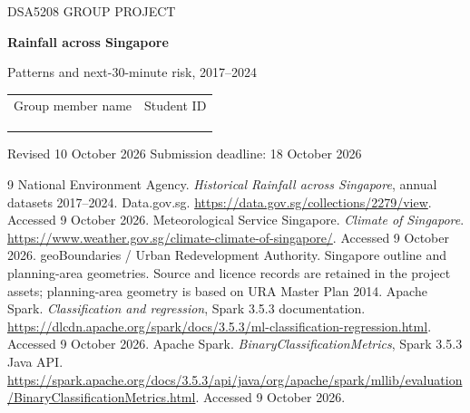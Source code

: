 \documentclass[11pt,a4paper]{article}
\begin{document}
\thispagestyle{empty}
{\small\sffamily\color{teal}DSA5208 GROUP PROJECT}\par
\vspace{3mm}
{\LARGE\sffamily\bfseries\color{ink}Rainfall across Singapore}\par
\vspace{1mm}
{\large\sffamily Patterns and next-30-minute risk, 2017--2024}\par
\vspace{4mm}
\begin{tabularx}{\linewidth}{@{}>{\raggedright\arraybackslash}X>{\raggedright\arraybackslash}X@{}}
\small Group member name & \small Student ID\\[5pt]
\hrulefill & \hrulefill\\[5pt]
\hrulefill & \hrulefill\\[5pt]
\hrulefill & \hrulefill\\
\end{tabularx}
\vspace{2mm}
{\small Revised 10 October 2026 \hfill Submission deadline: 18 October 2026}\par


\FloatBarrier

\FloatBarrier

\FloatBarrier

\begingroup\small\raggedright
\begin{thebibliography}{9}
 National Environment Agency. \emph{Historical Rainfall across Singapore}, annual datasets 2017--2024. Data.gov.sg. \url{https://data.gov.sg/collections/2279/view}. Accessed 9 October 2026.
 Meteorological Service Singapore. \emph{Climate of Singapore}. \url{https://www.weather.gov.sg/climate-climate-of-singapore/}. Accessed 9 October 2026.
 geoBoundaries / Urban Redevelopment Authority. Singapore outline and planning-area geometries. Source and licence records are retained in the project assets; planning-area geometry is based on URA Master Plan 2014.
 Apache Spark. \emph{Classification and regression}, Spark 3.5.3 documentation. \url{https://dlcdn.apache.org/spark/docs/3.5.3/ml-classification-regression.html}. Accessed 9 October 2026.
 Apache Spark. \emph{BinaryClassificationMetrics}, Spark 3.5.3 Java API. \url{https://spark.apache.org/docs/3.5.3/api/java/org/apache/spark/mllib/evaluation/BinaryClassificationMetrics.html}. Accessed 9 October 2026.
\end{thebibliography}
\endgroup
\end{document}
